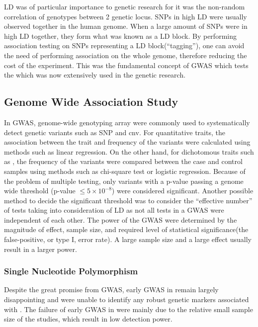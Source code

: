 	\gls{LD} was of particular importance to genetic research for it was the non-random correlation of genotypes between 2 genetic locus. 
	\glspl{SNP} in high \gls{LD} were usually observed together in the human genome.
	When a large amount of \glspl{SNP} were in high \gls{LD} together, they form what was known as a \gls{LD} block.
	By performing association testing on \glspl{SNP} representing a \gls{LD} block(``tagging''), one can avoid the need of performing association on the whole genome, therefore reducing the cost of the experiment.
	This was the fundamental concept of \gls{GWAS} which tests the 
	which was now extensively used in the genetic research.
	
	\subsection{Genome Wide Association Study}
	In \gls{GWAS}, genome-wide genotyping array were commonly used to systematically detect genetic variants such as \gls{SNP} and \gls{cnv}.
	For quantitative traits, the association between the trait and frequency of the variants were calculated using methods such as linear regression.
	On the other hand, for dichotomous traits such as , the frequency of the variants were compared between the case and control samples using methods such as chi-square test or logistic regression.
	Because of the problem of multiple testing, only variants with a p-value passing a genome wide threshold (p-value $\le5\times10^{-8}$) were considered significant.
	Another possible method to decide the significant threshold was to consider the ``effective number'' of tests\citep{Li2011} taking into consideration of \gls{LD} as not all tests in a \gls{GWAS} were independent of each other. 
	The power of the \gls{GWAS} were determined by the magnitude of effect, sample size, and required level of statistical significance(the false-positive, or type I, error rate)\citep{Purcell2003}.
	A large sample size and a large effect usually result in a larger power.
	
	\subsubsection{Single Nucleotide Polymorphism} 
	Despite the great promise from \gls{GWAS}, early \gls{GWAS} in  remain largely disappointing and were unable to identify any robust genetic markers associated with .
	The failure of early \gls{GWAS} in  were mainly due to the relative small sample size of the studies, which result in low detection power.
	

